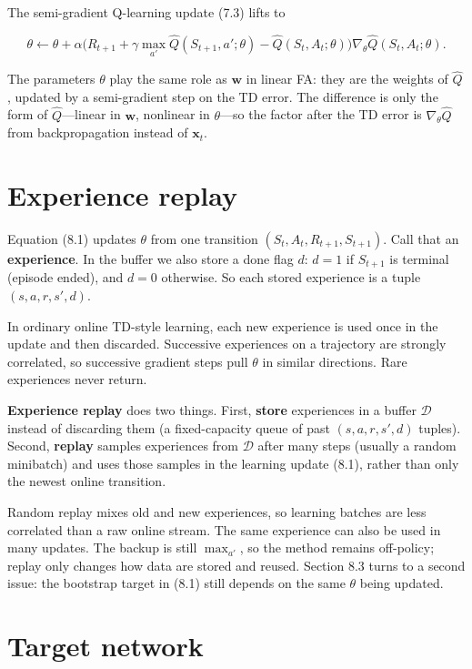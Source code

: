 The semi-gradient Q-learning update (7.3) lifts to

\begin{equation}
\theta
\leftarrow
\theta
+
\alpha
\bigl(
R_{t+1}
+
\gamma\max_{a'}\hat{Q}(S_{t+1},a';\theta)
-
\hat{Q}(S_t,A_t;\theta)
\bigr)
\nabla_\theta\hat{Q}(S_t,A_t;\theta).
\tag{8.1}
\end{equation}

The parameters $\theta$ play the same role as $\mathbf{w}$ in linear FA: they are the weights of $\hat{Q}$, updated by a semi-gradient step on the TD error. The difference is only the form of $\hat{Q}$---linear in $\mathbf{w}$, nonlinear in $\theta$---so the factor after the TD error is $\nabla_\theta\hat{Q}$ from backpropagation instead of $\mathbf{x}_t$.

\section{Experience replay}

Equation (8.1) updates $\theta$ from one transition $(S_t,A_t,R_{t+1},S_{t+1})$. Call that an \textbf{experience}. In the buffer we also store a done flag $d$: $d=1$ if $S_{t+1}$ is terminal (episode ended), and $d=0$ otherwise. So each stored experience is a tuple $(s,a,r,s',d)$.

In ordinary online TD-style learning, each new experience is used once in the update and then discarded. Successive experiences on a trajectory are strongly correlated, so successive gradient steps pull $\theta$ in similar directions. Rare experiences never return.

\textbf{Experience replay} does two things. First, \textbf{store} experiences in a buffer $\mathcal{D}$ instead of discarding them (a fixed-capacity queue of past $(s,a,r,s',d)$ tuples). Second, \textbf{replay} samples experiences from $\mathcal{D}$ after many steps (usually a random minibatch) and uses those samples in the learning update (8.1), rather than only the newest online transition.

Random replay mixes old and new experiences, so learning batches are less correlated than a raw online stream. The same experience can also be used in many updates. The backup is still $\max_{a'}$, so the method remains off-policy; replay only changes how data are stored and reused. Section 8.3 turns to a second issue: the bootstrap target in (8.1) still depends on the same $\theta$ being updated.

\section{Target network}

